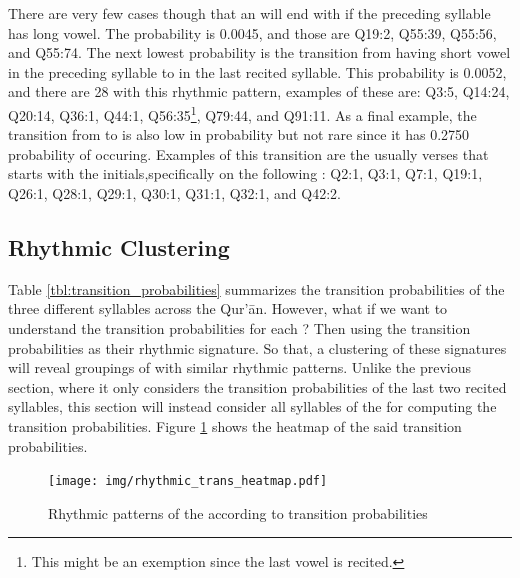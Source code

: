 There are very few cases though that an   will end with   if the preceding syllable has long vowel. The probability is 0.0045, and those   are Q19:2, Q55:39, Q55:56, and Q55:74. The next lowest probability is the transition from having short vowel in the preceding syllable to   in the last recited syllable. This probability is 0.0052, and there are 28   with this rhythmic pattern, examples of these are: Q3:5, Q14:24, Q20:14, Q36:1, Q44:1, Q56:35\footnote{This might be an exemption since the last vowel is recited.}, Q79:44, and Q91:11. As a final example, the transition from   to   is also low in probability but not rare since it has 0.2750 probability of occuring. Examples of this transition are the usually verses that starts with the initials,specifically on the following  : Q2:1, Q3:1, Q7:1, Q19:1, Q26:1, Q28:1, Q29:1, Q30:1, Q31:1, Q32:1, and Q42:2. 

\subsection{Rhythmic Clustering}
Table \ref{tbl:transition_probabilities} summarizes the transition probabilities of the three different syllables across the Qur'\=an. However, what if we want to understand the transition probabilities for each  ? Then using the transition probabilities as their rhythmic signature. So that, a clustering of these signatures will reveal groupings of   with similar rhythmic patterns. Unlike the previous section, where it only considers the transition probabilities of the last two recited syllables, this section will instead consider all syllables of the   for computing the transition probabilities. Figure \ref{fig:result_rhythmic_trans_heatmap} shows the heatmap of the said transition probabilities.

\begin{figure}[!t]
    \centering
    \texttt{[image: img/rhythmic\_trans\_heatmap.pdf]}
    \caption{Rhythmic patterns of the   according to transition probabilities}
    \label{fig:result_rhythmic_trans_heatmap}
\end{figure}

